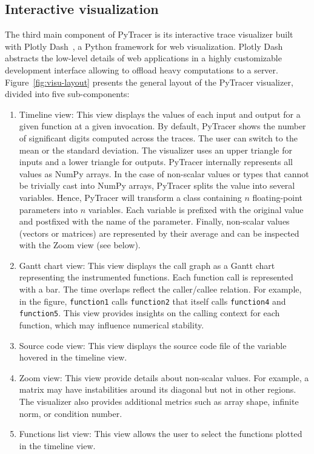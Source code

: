 \documentclass[11pt]{article}
\newcommand{\pytracer}[0]{PyTracer\xspace}
\begin{document}
\subsection{Interactive visualization}
The third main component of \pytracer is its interactive trace visualizer built with Plotly Dash~\cite{plotly}, a Python framework for web visualization.
Plotly Dash abstracts the low-level details of web applications in a highly customizable development interface allowing to offload heavy computations to a server. 
Figure~\ref{fig:visu-layout} presents the general layout of the \pytracer visualizer, divided into five sub-components:
\begin{enumerate}
 \item Timeline view: This view displays the values of each input and output for a given function at a given invocation. By default, \pytracer shows the number of significant digits computed across the traces. The user can switch to the mean or the standard deviation. The visualizer uses an upper triangle for inputs and a lower triangle for outputs. \pytracer internally represents all values as NumPy arrays.    In the case of non-scalar values or types that cannot be trivially cast into NumPy arrays, \pytracer splits the value into several variables. Hence, \pytracer will transform a class containing $n$ floating-point parameters into $n$ variables. Each variable is prefixed with the original value and postfixed with the name of the parameter. 
    Finally, non-scalar values (vectors or matrices) are represented by their average and can be inspected with the Zoom view (see below).
 \item Gantt chart view: This view displays the call graph as a Gantt chart representing the instrumented functions. Each function call is represented with a bar.
    The time overlaps reflect the caller/callee relation.
    For example, in the figure, \texttt{function1} calls \texttt{function2} that itself calls \texttt{function4} and \texttt{function5}. 
    This view provides insights on the calling context for each function, which may influence numerical stability. 
 \item  Source code view: This view displays the source code file of the variable hovered in the timeline view. 
 \item Zoom view: This view provide details about non-scalar values. For example, a matrix may have instabilities around its diagonal but not in other regions.
    The visualizer also provides additional metrics such as array shape, infinite norm, or condition number.
\item  Functions list view: This view allows the user to select the functions plotted in the timeline view.
\end{enumerate}
\end{document}
